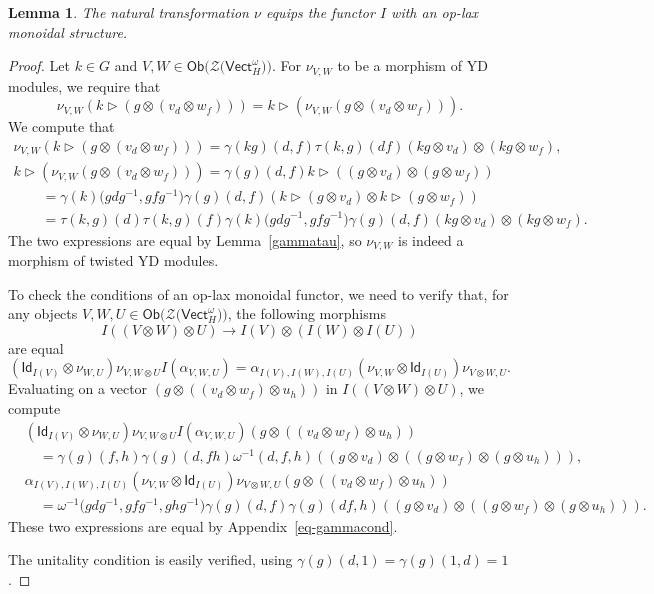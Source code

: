 \documentclass[pdftex]{sigma}
\numberwithin{equation}{section}
\newtheorem{Lemma}[Theorem]{Lemma}
\newcommand{\ide}{\mathsf{Id}}
\newcommand{\Ob}{\mathsf{Ob}}
\newcommand{\Vect}{\mathsf{Vect}}
\newcommand{\cZ}{\mathcal{Z}}
\newcommand{\rI}{I}
\begin{document}
\begin{Lemma}\label{lem:oplax}
The natural transformation $\nu$ equips the functor $\rI$ with an op-lax monoidal structure.
\end{Lemma}

\begin{proof}
Let $k \in G$ and $V,W \in \Ob \big( \cZ\big(\Vect_H^\omega\big) \big)$. For $\nu_{V,W}$ to be a morphism of YD modules, we require that \[\nu_{V,W}(k\vartriangleright (g \otimes (v_d \otimes w_f))) = k \vartriangleright (\nu_{V,W}(g \otimes (v_d \otimes w_f))).\]
We compute that
\begin{gather*}
 \nu_{V,W}(k\vartriangleright (g \otimes (v_d \otimes w_f))) = \gamma(kg)(d,f)\tau(k,g)(df)(kg \otimes v_d) \otimes (kg \otimes w_f), \\
 k \vartriangleright (\nu_{V,W}(g \otimes (v_d \otimes w_f))) = \gamma(g)(d,f) k \vartriangleright ((g\otimes v_d) \otimes (g \otimes w_f)) \\
\qquad{} =\gamma(k)\big(gdg^{-1},gfg^{-1}\big)\gamma(g)(d,f)
 (k\vartriangleright(g \otimes v_d) \otimes k \vartriangleright (g \otimes w_f)) \\
 \qquad{} =\tau(k,g)(d)\tau(k,g)(f)\gamma(k)\big(gdg^{-1},gfg^{-1}\big) \gamma(g)(d,f)(kg \otimes v_d) \otimes (kg \otimes w_f).
\end{gather*}
The two expressions are equal by Lemma~\ref{gammatau}, so $\nu_{V,W}$ is indeed a morphism of twisted YD modules.

To check the conditions of an op-lax monoidal functor, we need to verify that, for any objects $V,W,U \in \Ob \big( \cZ \big( \Vect_H^\omega \big)\big) $, the following morphisms \[
\rI( ( V \otimes W ) \otimes U) \to \rI(V) \otimes (\rI(W) \otimes \rI(U))\]
 are equal
\begin{equation*}
 (\ide_{\rI(V)}\otimes \nu_{W,U})\nu_{V,W\otimes U}I(\alpha_{V,W,U}) = \alpha_{\rI(V),\rI(W),\rI(U)} (\nu_{V,W} \otimes \ide_{\rI(U)}) \nu_{V\otimes W,U}.
\end{equation*}
Evaluating on a vector $(g \otimes ((v_d \otimes w_f) \otimes u_h))$ in $\rI( ( V \otimes W ) \otimes U)$, we compute
\begin{align*}
 &(\ide_{\rI(V)}\otimes \nu_{W,U})\nu_{V,W\otimes U}I(\alpha_{V,W,U})(g \otimes ((v_d \otimes w_f) \otimes u_h)) \\
 &\quad= \gamma(g)(f,h)\gamma(g)(d,fh) \omega^{-1}(d,f,h)((g\otimes v_d)\otimes ((g\otimes w_f) \otimes (g\otimes u_h))),\\
&\alpha_{\rI(V),\rI(W),\rI(U)} (\nu_{V,W} \otimes \ide_{\rI(U)}) \nu_{V\otimes W,U}(g \otimes ((v_d \otimes w_f) \otimes u_h)) \\
 &\quad= \omega^{-1}\big(gdg^{-1},gfg^{-1},ghg^{-1}\big)\gamma(g)(d,f)\gamma(g)(df,h)
((g\otimes v_d)\otimes ((g\otimes w_f) \otimes (g\otimes u_h))).
\end{align*}
These two expressions are equal by Appendix~\ref{eq-gammacond}.

The unitality condition is easily verified, using $\gamma(g)(d,1)=\gamma(g)(1,d)=1$.
\end{proof}
\end{document}
